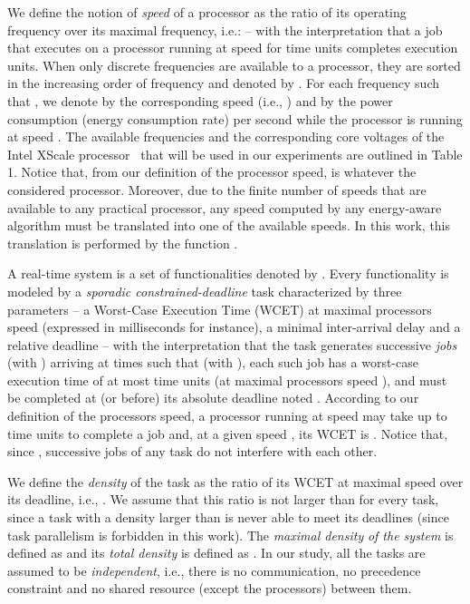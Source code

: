 \documentclass[times, 10pt,twocolumn]{article}
\begin{document}
We define the notion of \emph{speed}  of a processor as the ratio of its operating frequency  over its maximal frequency, i.e.:  -- with the interpretation that a job that executes on a processor running at speed  for  time units completes  execution units. When only  discrete frequencies are available to a processor, they are sorted in the increasing order of frequency and denoted by . For each frequency  such that , we denote by  the corresponding speed (i.e., ) and by  the power consumption (energy consumption rate) per second while the processor is running at speed . The available frequencies and the corresponding core voltages of the Intel XScale processor~\cite{IntelXScale} that will be used in our experiments are outlined in Table 1. Notice that, from our definition of the processor speed,  is  whatever the considered processor. Moreover, due to the finite number of speeds that are available to any practical processor, any speed  computed by any energy-aware algorithm must be translated into one of the available speeds. In this work, this translation is performed by the function .




A real-time system  is a set of  functionalities denoted by . Every functionality  is modeled by a \emph{sporadic constrained-deadline} task characterized by three parameters  -- a Worst-Case Execution Time (WCET)  {at maximal processors speed } (expressed in milliseconds for instance), a minimal inter-arrival delay  and a relative deadline  -- with the interpretation that the task  generates successive \emph{jobs}  (with ) arriving at times  such that  (with ), each such job has a worst-case execution time of at most  time units (at maximal processors speed ), and must be completed at (or before) its absolute deadline noted . According to our definition of the processors speed, a processor running at speed  may take up to  time units to complete a job  and, at a given speed , its WCET is . Notice that, since , successive jobs of any task  do not interfere with each other. 

We define the \emph{density}  of the task  as the ratio of its WCET at maximal speed  over its deadline, i.e., . We assume that this ratio is not larger than  for every task, since a task with a density larger than  is never able to meet its deadlines (since task parallelism is forbidden in this work). The \emph{maximal density}  \emph{of the system} is defined as  and its \emph{total density} is defined as . In our study, all the tasks are assumed to be \emph{independent}, i.e., there is no communication, no precedence constraint and no shared resource (except the processors) between them. 
\end{document}
